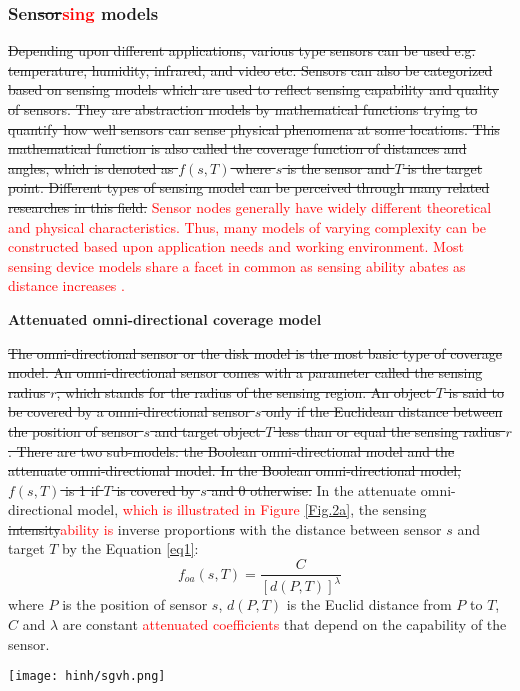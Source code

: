 \documentclass[final]{elsarticle}
\begin{document}
\subsubsection{Sen\sout{sor}\textcolor{red}{sing} models}
\sout{Depending upon different applications, various type sensors can be used e.g. temperature, humidity, infrared, and video etc. Sensors can also be categorized based on sensing models which are used to reflect sensing capability and quality of sensors. They are abstraction models by mathematical functions trying to quantify how well sensors can sense physical phenomena at some locations. This mathematical function is also called the coverage function of distances and angles, which is denoted as $f(s, T)$ where $ s $ is the sensor and $ T $ is the target point. Different types of sensing model can be perceived through many related researches in this field.}
\textcolor{red}{Sensor nodes generally have widely different theoretical and physical characteristics. Thus, many models of varying complexity can be constructed based upon application needs and working environment. Most sensing device models share a facet in common as sensing ability abates as distance increases \cite{megerian2002exposure}.}	

\noindent\textbf{Attenuated omni-directional coverage model}

\sout{The omni-directional sensor or the disk model is the most basic type of coverage model. An omni-directional sensor comes with a parameter called the sensing radius $r$, which stands for the radius of the sensing region. An object $ T $ is said to be covered by a omni-directional sensor $ s $ only if the Euclidean distance between the position of sensor $ s $ and target object $ T $ less than or equal the sensing radius $r$. There are two sub-models: the Boolean omni-directional model and the attenuate omni-directional model. In the Boolean omni-directional model, $f(s, T)$ is 1 if $ T $ is covered by $ s $ and 0 otherwise.}
In the attenuate omni-directional model, \textcolor{red}{which is illustrated in Figure \ref{Fig.2a}}, the sensing \sout{intensity}\textcolor{red}{ability is} inverse proportion\sout{s} with the distance between sensor $ s $ and target $ T $ by the Equation \ref{eq1}:
\begin{equation}
\label{eq1}
f_{oa}({s},T) = \frac{C}{{{{\left[ {d(P,T)} \right]}^\lambda }}}
\end{equation}
where $ P $ is the position of sensor $ s $, $ d(P,T) $ is the Euclid distance from $ P $ to $ T $, $ C $ and $ \lambda $ are constant \textcolor{red}{attenuated coefficients} that depend on the capability of the sensor. 
\begin{figure*}[h]
	\centering
	\texttt{[image: hinh/sgvh.png]}
	\caption{Attenuated sensing ability of an omni-directional sensor}
	\label{Fig.2a}       %
\end{figure*}
\end{document}
